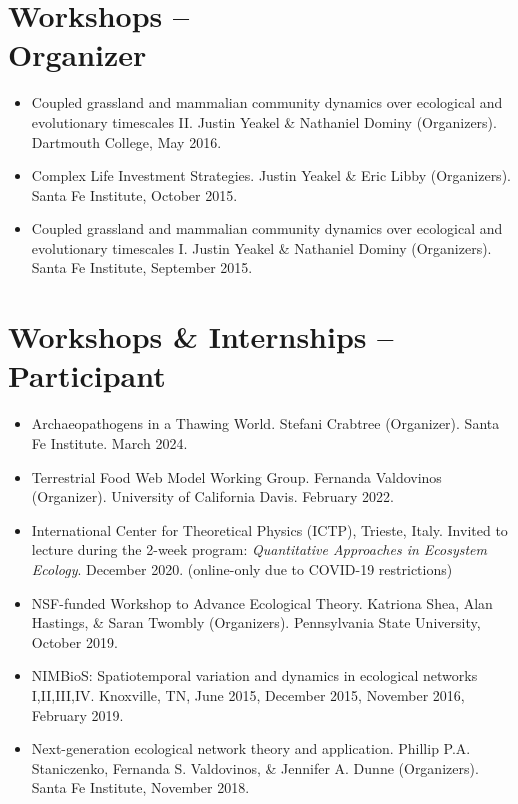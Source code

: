 \documentclass[margin,line,12pt]{res}
\begin{document}
\begin{resume}
\section{\sc Workshops -- \\ Organizer}
\begin{itemize}
\item Coupled grassland and mammalian community dynamics over ecological and evolutionary timescales II. Justin Yeakel \& Nathaniel Dominy (Organizers). Dartmouth College, May 2016.

\item Complex Life Investment Strategies. Justin Yeakel \& Eric Libby (Organizers). Santa Fe Institute, October 2015.

\item Coupled grassland and mammalian community dynamics over ecological and evolutionary timescales I. Justin Yeakel \& Nathaniel Dominy (Organizers). Santa Fe Institute, September 2015.
\end{itemize}


\section{\sc Workshops \& Internships -- \\ Participant}
\begin{itemize}
\item Archaeopathogens in a Thawing World. Stefani Crabtree (Organizer). Santa Fe Institute. March 2024.

\item Terrestrial Food Web Model Working Group. Fernanda Valdovinos (Organizer). University of California Davis. February 2022.
  
\item International Center for Theoretical Physics (ICTP), Trieste, Italy. Invited to lecture during the 2-week program: \emph{Quantitative Approaches in Ecosystem Ecology}. December 2020. (online-only due to COVID-19 restrictions)

\item NSF-funded Workshop to Advance Ecological Theory. Katriona Shea, Alan Hastings, \& Saran Twombly (Organizers). Pennsylvania State University, October 2019.

\item NIMBioS: Spatiotemporal variation and dynamics in ecological networks I,II,III,IV. Knoxville, TN, June 2015, December 2015, November 2016, February 2019.  

\item Next-generation ecological network theory and application. Phillip P.A. Staniczenko, Fernanda S. Valdovinos, \& Jennifer A. Dunne (Organizers). Santa Fe Institute, November 2018.


\end{itemize}
\end{resume}
\end{document}
